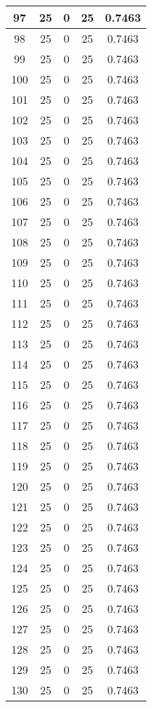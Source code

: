 \documentclass[letterpaper, 12pt]{article}
\begin{document}
\begin{longtable}{|c|c|c|c|c|}
\hline
97 & 25 & 0 & 25 & 0.7463 \\
\hline
98 & 25 & 0 & 25 & 0.7463 \\
\hline
99 & 25 & 0 & 25 & 0.7463 \\
\hline
100 & 25 & 0 & 25 & 0.7463 \\
\hline
101 & 25 & 0 & 25 & 0.7463 \\
\hline
102 & 25 & 0 & 25 & 0.7463 \\
\hline
103 & 25 & 0 & 25 & 0.7463 \\
\hline
104 & 25 & 0 & 25 & 0.7463 \\
\hline
105 & 25 & 0 & 25 & 0.7463 \\
\hline
106 & 25 & 0 & 25 & 0.7463 \\
\hline
107 & 25 & 0 & 25 & 0.7463 \\
\hline
108 & 25 & 0 & 25 & 0.7463 \\
\hline
109 & 25 & 0 & 25 & 0.7463 \\
\hline
110 & 25 & 0 & 25 & 0.7463 \\
\hline
111 & 25 & 0 & 25 & 0.7463 \\
\hline
112 & 25 & 0 & 25 & 0.7463 \\
\hline
113 & 25 & 0 & 25 & 0.7463 \\
\hline
114 & 25 & 0 & 25 & 0.7463 \\
\hline
115 & 25 & 0 & 25 & 0.7463 \\
\hline
116 & 25 & 0 & 25 & 0.7463 \\
\hline
117 & 25 & 0 & 25 & 0.7463 \\
\hline
118 & 25 & 0 & 25 & 0.7463 \\
\hline
119 & 25 & 0 & 25 & 0.7463 \\
\hline
120 & 25 & 0 & 25 & 0.7463 \\
\hline
121 & 25 & 0 & 25 & 0.7463 \\
\hline
122 & 25 & 0 & 25 & 0.7463 \\
\hline
123 & 25 & 0 & 25 & 0.7463 \\
\hline
124 & 25 & 0 & 25 & 0.7463 \\
\hline
125 & 25 & 0 & 25 & 0.7463 \\
\hline
126 & 25 & 0 & 25 & 0.7463 \\
\hline
127 & 25 & 0 & 25 & 0.7463 \\
\hline
128 & 25 & 0 & 25 & 0.7463 \\
\hline
129 & 25 & 0 & 25 & 0.7463 \\
\hline
130 & 25 & 0 & 25 & 0.7463 \\

\end{longtable}
\end{document}
